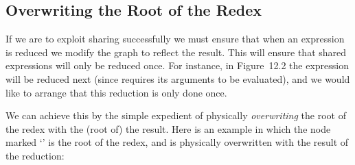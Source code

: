 

\subsection{Overwriting the Root of the Redex}

If we are to exploit sharing successfully we must ensure that when an
expression is reduced we modify the graph to reflect the result. This will
ensure that shared expressions will only be reduced once. For instance, in
Figure~12.2 the  expression will be reduced next (since 
requires its arguments to be evaluated), and we would like to arrange that this
reduction is only done once.

We can achieve this by the simple expedient of physically \textit{overwriting} the
root of the redex with the (root of) the result. Here is an example in which the
node marked `\ml{\$}' is the root of the redex, and is physically overwritten with the
result of the reduction:

